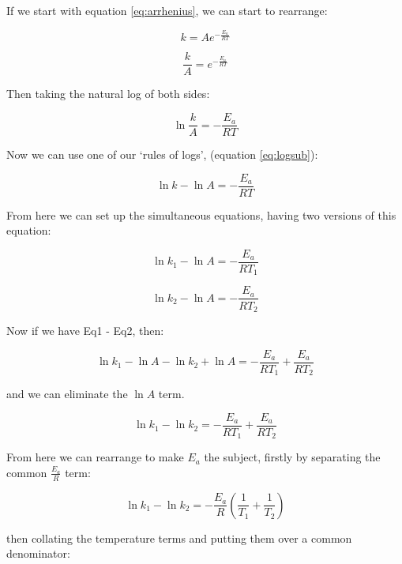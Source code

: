 \documentclass[
]{book}
\begin{document}
If we start with equation \eqref{eq:arrhenius}, we can start to rearrange:

\begin{equation*}
k = A e^{-\frac{E_a}{RT}}
\end{equation*}

\begin{equation*}
\frac{k}{A}=e^{-\frac{E_a}{RT}}
\end{equation*}

Then taking the natural log of both sides:

\begin{equation*}
\ln \frac{k}{A}= -\frac{E_a}{RT}
\end{equation*}

Now we can use one of our `rules of logs', (equation \eqref{eq:logsub}):

\begin{equation*}
\ln {k} - \ln {A}= -\frac{E_a}{RT}
\end{equation*}

From here we can set up the simultaneous equations, having two versions of this equation:

\begin{equation*}
\ln {k_1} - \ln {A}= -\frac{E_a}{RT_1}
\end{equation*}

\begin{equation*}
\ln {k_2} - \ln {A}= -\frac{E_a}{RT_2} 
\end{equation*}

Now if we have Eq1 - Eq2, then:

\begin{equation*}
\ln {k_1} - \ln {A} - \ln {k_2} + \ln {A}= -\frac{E_a}{RT_1} + \frac{E_a}{RT_2}
\end{equation*}

and we can eliminate the \(\ln A\) term.

\begin{equation*}
\ln {k_1} - \ln {k_2} = -\frac{E_a}{RT_1} + \frac{E_a}{RT_2}
\end{equation*}

From here we can rearrange to make \(E_a\) the subject, firstly by separating the common \(\frac{E_a}{R}\) term:

\begin{equation*}
\ln {k_1} - \ln {k_2} = -\frac{E_a}{R} \left(\frac{1}{T_1} + \frac{1}{T_2} \right)
\end{equation*}

then collating the temperature terms and putting them over a common denominator:
\end{document}
